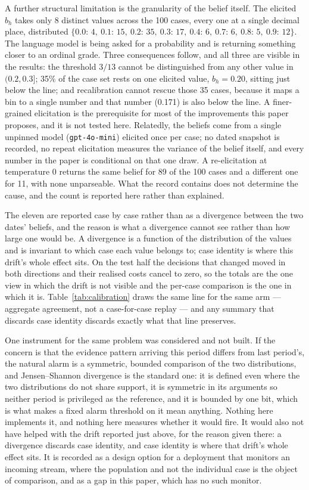\documentclass{article}
\begin{document}
A further structural limitation is the granularity of the belief itself. The
elicited $b_h$ takes only 8 distinct values across the 100 cases, every one at a
single decimal place, distributed
$\{0.0{:}\,4,\ 0.1{:}\,15,\ 0.2{:}\,35,\ 0.3{:}\,17,\
0.4{:}\,6,\ 0.7{:}\,6,\ 0.8{:}\,5,\ 0.9{:}\,12\}$. The language model is being asked
for a probability and is returning something closer to an ordinal grade. Three
consequences follow, and all three are visible in the results: the threshold $3/13$
cannot be distinguished from any other value in $(0.2, 0.3]$; 35\% of the case set
rests on one elicited value, $b_h = 0.20$, sitting just below the line; and
recalibration cannot rescue those 35 cases, because it maps a bin to a single
number and that number (0.171) is also below the line. A finer-grained elicitation
is the prerequisite for most of the improvements this paper proposes, and it is not
tested here. Relatedly, the beliefs come from a single unpinned model
(\texttt{gpt-4o-mini}) elicited once per case; no dated snapshot is recorded, no
repeat elicitation measures the variance of the belief itself, and every number in
the paper is conditional on that one draw. A re-elicitation at temperature 0
returns the same belief for 89 of the 100 cases and a different one for 11, with
none unparseable. What the record contains does not determine the cause, and the
count is reported here rather than explained.

The eleven are reported case by case rather than as a divergence between the two
dates' beliefs, and the reason is what a divergence cannot see rather than how large
one would be. A divergence is a function of the distribution of the values and is
invariant to which case each value belongs to; case identity is where this drift's
whole effect sits. On the test half the decisions that changed moved in both
directions and their realised costs cancel to zero, so the totals are the one view
in which the drift is not visible and the per-case comparison is the one in which it
is. Table~\ref{tab:calibration} draws the same line for the same arm --- aggregate
agreement, not a case-for-case replay --- and any summary that discards case identity
discards exactly what that line preserves.

One instrument for the same problem was considered and not built. If the concern is
that the evidence pattern arriving this period differs from last period's, the
natural alarm is a symmetric, bounded comparison of the two distributions, and
Jensen--Shannon divergence is the standard one: it is defined even where the two
distributions do not share support, it is symmetric in its arguments so neither
period is privileged as the reference, and it is bounded by one bit, which is what
makes a fixed alarm threshold on it mean anything. Nothing here implements it, and
nothing here measures whether it would fire. It would also not have helped with the
drift reported just above, for the reason given there: a divergence discards case
identity, and case identity is where that drift's whole effect sits. It is recorded
as a design option for a deployment that monitors an incoming stream, where the
population and not the individual case is the object of comparison, and as a gap in
this paper, which has no such monitor.
\end{document}
